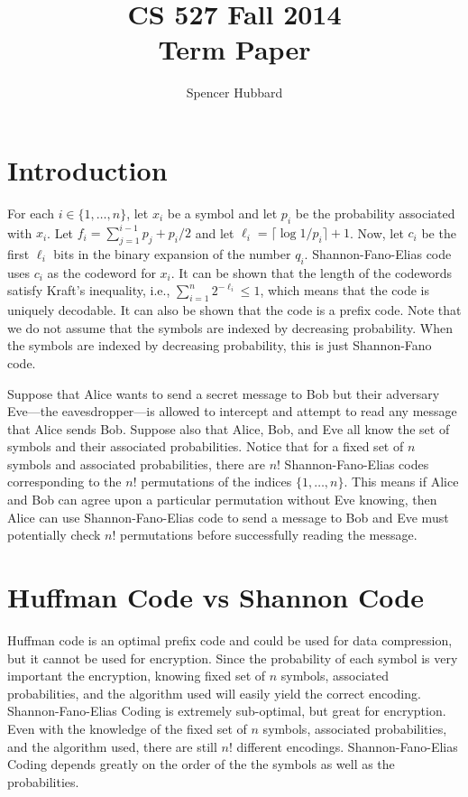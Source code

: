 \documentclass[10pt,letterpaper,notitlepage,draft]{article}
\title{CS 527 Fall 2014\\Term Paper}
\author{Spencer Hubbard} %
\date{} %
\theoremstyle{definition}
\begin{document}
\maketitle


\section{Introduction}
For each $i \in \lbrace 1, \ldots, n\rbrace$, let $x_i$ be a symbol and let $p_i$ be the probability associated with $x_i$. 
Let $f_i = \sum_{j=1}^{i-1} p_j + p_i / 2$ and let $\ell_i = \lceil\log 1 / p_i \rceil + 1$. 
Now, let $c_i$ be the first $\ell_i$ bits in the binary expansion of the number $q_i$. 
Shannon-Fano-Elias code uses $c_i$ as the codeword for $x_i$. 
It can be shown that the length of the codewords satisfy Kraft's inequality, i.e., $\sum_{i=1}^n 2^{-\ell_i} \le 1$, which means that the code is uniquely decodable. 
It can also be shown that the code is a prefix code. 
Note that we do not assume that the symbols are indexed by decreasing probability. 
When the symbols are indexed by decreasing probability, this is just Shannon-Fano code.

Suppose that Alice wants to send a secret message to Bob but their adversary Eve---the eavesdropper---is allowed to intercept and attempt to read any message that Alice sends Bob. 
Suppose also that Alice, Bob, and Eve all know the set of symbols and their associated probabilities. 
Notice that for a fixed set of $n$ symbols and associated probabilities, there are $n!$ Shannon-Fano-Elias codes corresponding to the $n!$ permutations of the indices $\lbrace 1, \dots, n\rbrace$. 
This means if Alice and Bob can agree upon a particular permutation without Eve knowing, then Alice can use Shannon-Fano-Elias code to send a message to Bob and Eve must potentially check $n!$ permutations before successfully reading the message.

\section{Huffman Code vs Shannon Code}
Huffman code is an optimal prefix code and could be used for data compression, but it cannot be used for encryption.
Since the probability of each symbol is very important the encryption, knowing fixed set of $n$ symbols, associated probabilities, and the algorithm used will easily yield the correct encoding. 
Shannon-Fano-Elias Coding is extremely sub-optimal, but great for encryption.
Even with the knowledge of the fixed set of $n$ symbols, associated probabilities, and the algorithm used, there are still $n!$ different encodings. 
Shannon-Fano-Elias Coding depends greatly on the order of the the symbols as well as the probabilities.
\end{document}
